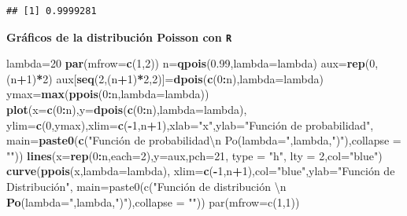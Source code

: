 \documentclass[]{book}
\newenvironment{Shaded}{\begin{snugshade}}{\end{snugshade}}
\newcommand{\CharTok}[1]{\textcolor[rgb]{0.31,0.60,0.02}{#1}}
\newcommand{\DataTypeTok}[1]{\textcolor[rgb]{0.13,0.29,0.53}{#1}}
\newcommand{\DecValTok}[1]{\textcolor[rgb]{0.00,0.00,0.81}{#1}}
\newcommand{\FloatTok}[1]{\textcolor[rgb]{0.00,0.00,0.81}{#1}}
\newcommand{\KeywordTok}[1]{\textcolor[rgb]{0.13,0.29,0.53}{\textbf{#1}}}
\newcommand{\NormalTok}[1]{#1}
\newcommand{\OperatorTok}[1]{\textcolor[rgb]{0.81,0.36,0.00}{\textbf{#1}}}
\newcommand{\StringTok}[1]{\textcolor[rgb]{0.31,0.60,0.02}{#1}}
\begin{document}
\begin{verbatim}
## [1] 0.9999281
\end{verbatim}

\textbf{Gráficos de la distribución Poisson con \texttt{R}}

\begin{Shaded}
\begin{Highlighting}[]
\NormalTok{lambda=}\DecValTok{20}
\KeywordTok{par}\NormalTok{(}\DataTypeTok{mfrow=}\KeywordTok{c}\NormalTok{(}\DecValTok{1}\NormalTok{,}\DecValTok{2}\NormalTok{))}
\NormalTok{n=}\KeywordTok{qpois}\NormalTok{(}\FloatTok{0.99}\NormalTok{,}\DataTypeTok{lambda=}\NormalTok{lambda)}
\NormalTok{aux=}\KeywordTok{rep}\NormalTok{(}\DecValTok{0}\NormalTok{,(n}\OperatorTok{+}\DecValTok{1}\NormalTok{)}\OperatorTok{*}\DecValTok{2}\NormalTok{)}
\NormalTok{aux[}\KeywordTok{seq}\NormalTok{(}\DecValTok{2}\NormalTok{,(n}\OperatorTok{+}\DecValTok{1}\NormalTok{)}\OperatorTok{*}\DecValTok{2}\NormalTok{,}\DecValTok{2}\NormalTok{)]=}\KeywordTok{dpois}\NormalTok{(}\KeywordTok{c}\NormalTok{(}\DecValTok{0}\OperatorTok{:}\NormalTok{n),}\DataTypeTok{lambda=}\NormalTok{lambda)}
\NormalTok{ymax=}\KeywordTok{max}\NormalTok{(}\KeywordTok{ppois}\NormalTok{(}\DecValTok{0}\OperatorTok{:}\NormalTok{n,}\DataTypeTok{lambda=}\NormalTok{lambda))}
\KeywordTok{plot}\NormalTok{(}\DataTypeTok{x=}\KeywordTok{c}\NormalTok{(}\DecValTok{0}\OperatorTok{:}\NormalTok{n),}\DataTypeTok{y=}\KeywordTok{dpois}\NormalTok{(}\KeywordTok{c}\NormalTok{(}\DecValTok{0}\OperatorTok{:}\NormalTok{n),}\DataTypeTok{lambda=}\NormalTok{lambda),}
     \DataTypeTok{ylim=}\KeywordTok{c}\NormalTok{(}\DecValTok{0}\NormalTok{,ymax),}\DataTypeTok{xlim=}\KeywordTok{c}\NormalTok{(}\OperatorTok{-}\DecValTok{1}\NormalTok{,n}\OperatorTok{+}\DecValTok{1}\NormalTok{),}\DataTypeTok{xlab=}\StringTok{"x"}\NormalTok{,}\DataTypeTok{ylab=}\StringTok{"Función de probabilidad"}\NormalTok{,}
     \DataTypeTok{main=}\KeywordTok{paste0}\NormalTok{(}\KeywordTok{c}\NormalTok{(}\StringTok{"Función de probabilidad}\CharTok{\textbackslash{}n}\StringTok{  Po(lambda="}\NormalTok{,lambda,}\StringTok{")"}\NormalTok{),}\DataTypeTok{collapse =} \StringTok{""}\NormalTok{))}
\KeywordTok{lines}\NormalTok{(}\DataTypeTok{x=}\KeywordTok{rep}\NormalTok{(}\DecValTok{0}\OperatorTok{:}\NormalTok{n,}\DataTypeTok{each=}\DecValTok{2}\NormalTok{),}\DataTypeTok{y=}\NormalTok{aux,}\DataTypeTok{pch=}\DecValTok{21}\NormalTok{, }\DataTypeTok{type =} \StringTok{"h"}\NormalTok{, }\DataTypeTok{lty =} \DecValTok{2}\NormalTok{,}\DataTypeTok{col=}\StringTok{"blue"}\NormalTok{)}
\KeywordTok{curve}\NormalTok{(}\KeywordTok{ppois}\NormalTok{(x,}\DataTypeTok{lambda=}\NormalTok{lambda),}
      \DataTypeTok{xlim=}\KeywordTok{c}\NormalTok{(}\OperatorTok{-}\DecValTok{1}\NormalTok{,n}\OperatorTok{+}\DecValTok{1}\NormalTok{),}\DataTypeTok{col=}\StringTok{"blue"}\NormalTok{,}\DataTypeTok{ylab=}\StringTok{"Función de Distribución",}
\StringTok{      main=paste0(c("}\NormalTok{Función de distribución \textbackslash{}n }\KeywordTok{Po}\NormalTok{(}\DataTypeTok{lambda=}\StringTok{",lambda,"}\NormalTok{)}\StringTok{"),collapse = ""))}
\StringTok{par(mfrow=c(1,1))}
\end{Highlighting}
\end{Shaded}
\end{document}

